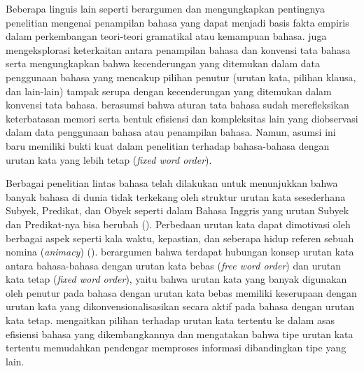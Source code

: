 Beberapa linguis lain seperti \cite{sagwasow2011pccg} berargumen dan mengungkapkan pentingnya penelitian mengenai penampilan bahasa yang dapat menjadi basis fakta empiris dalam perkembangan teori-teori gramatikal atau kemampuan bahasa. \cite{hawkins2014cross} juga mengeksplorasi keterkaitan antara penampilan bahasa dan konvensi tata bahasa serta mengungkapkan bahwa kecenderungan yang ditemukan dalam data penggunaan bahasa yang mencakup pilihan penutur (urutan kata, pilihan klausa, dan lain-lain) tampak serupa dengan kecenderungan yang ditemukan dalam konvensi tata bahasa. \cite{hawkins2014cross} berasumsi bahwa aturan tata bahasa sudah merefleksikan keterbatasan memori serta bentuk efisiensi dan kompleksitas lain yang diobservasi dalam data penggunaan bahasa atau penampilan bahasa. Namun, asumsi ini baru memiliki bukti kuat dalam penelitian terhadap bahasa-bahasa dengan urutan kata yang lebih tetap (\textit{fixed word order}). 

Berbagai penelitian lintas bahasa telah dilakukan untuk menunjukkan bahwa banyak bahasa di dunia tidak terkekang oleh struktur urutan kata sesederhana Subyek, Predikat, dan Obyek seperti dalam Bahasa Inggris yang urutan Subyek dan Predikat-nya bisa berubah (\citealp{macwhinneybates1989cross, birnerward1998noncanonical, lambrecht2000info}). Perbedaan urutan kata dapat dimotivasi oleh berbagai aspek seperti kala waktu, kepastian, dan seberapa hidup referen sebuah nomina (\textit{animacy}) (\citealp{dryer1992greenbergian, tsunoda1995adpositions, polinskaja1989object}). \cite{hawkins1994performance} berargumen bahwa terdapat hubungan konsep urutan kata antara bahasa-bahasa dengan urutan kata bebas (\textit{free word order}) dan urutan kata tetap (\textit{fixed word order}), yaitu bahwa urutan kata yang banyak digunakan oleh penutur pada bahasa dengan urutan kata bebas memiliki keserupaan dengan urutan kata yang dikonvensionalisasikan secara aktif pada bahasa dengan urutan kata tetap. \cite{hawkins1994performance} mengaitkan pilihan terhadap urutan kata tertentu ke dalam asas efisiensi bahasa yang dikembangkannya dan mengatakan bahwa tipe urutan kata tertentu memudahkan pendengar memproses informasi dibandingkan tipe yang lain.

